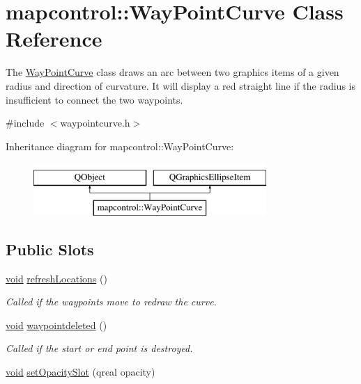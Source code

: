 \hypertarget{classmapcontrol_1_1_way_point_curve}{\section{mapcontrol\-:\-:Way\-Point\-Curve Class Reference}
\label{classmapcontrol_1_1_way_point_curve}
}


The \hyperlink{classmapcontrol_1_1_way_point_curve}{Way\-Point\-Curve} class draws an arc between two graphics items of a given radius and direction of curvature. It will display a red straight line if the radius is insufficient to connect the two waypoints.  




{\ttfamily \#include $<$waypointcurve.\-h$>$}

Inheritance diagram for mapcontrol\-:\-:Way\-Point\-Curve\-:\begin{figure}[H]
\begin{center}
\leavevmode
\includegraphics[height=2.000000cm]{classmapcontrol_1_1_way_point_curve}
\end{center}
\end{figure}
\subsection*{Public Slots}
\begin{DoxyCompactItemize}
\item 
\hyperlink{group___u_a_v_objects_plugin_ga444cf2ff3f0ecbe028adce838d373f5c}{void} \hyperlink{group___o_p_map_widget_ga5ce80f636cc1414d154b751de3a0f6f3}{refresh\-Locations} ()
\begin{DoxyCompactList}\small\item\em Called if the waypoints move to redraw the curve. \end{DoxyCompactList}\item 
\hyperlink{group___u_a_v_objects_plugin_ga444cf2ff3f0ecbe028adce838d373f5c}{void} \hyperlink{group___o_p_map_widget_gad0bb9ce622beb314a984fa559fb1d894}{waypointdeleted} ()
\begin{DoxyCompactList}\small\item\em Called if the start or end point is destroyed. \end{DoxyCompactList}\item 
\hyperlink{group___u_a_v_objects_plugin_ga444cf2ff3f0ecbe028adce838d373f5c}{void} \hyperlink{group___o_p_map_widget_ga61d082b265428ef62b08b8faf2fa8ec0}{set\-Opacity\-Slot} (qreal opacity)
\end{DoxyCompactItemize}
